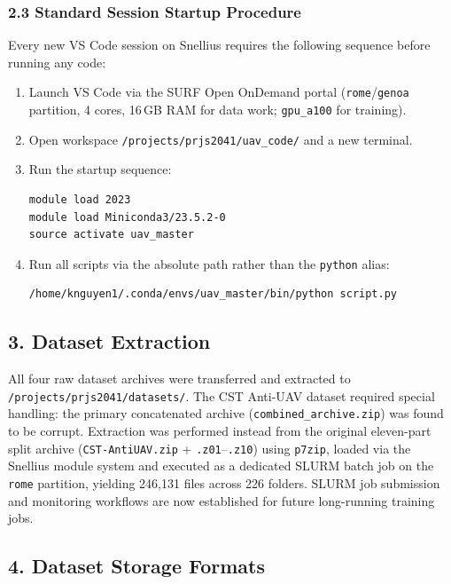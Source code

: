 \subsubsection*{2.3 Standard Session Startup Procedure}

Every new VS Code session on Snellius requires the following sequence
before running any code:

\begin{enumerate}
    \item Launch VS Code via the SURF Open OnDemand portal
          (\texttt{rome}/\texttt{genoa} partition, 4 cores, 16\,GB RAM
          for data work; \texttt{gpu\_a100} for training).
    \item Open workspace \texttt{/projects/prjs2041/uav\_code/} and a
          new terminal.
    \item Run the startup sequence:
\begin{verbatim}
module load 2023
module load Miniconda3/23.5.2-0
source activate uav_master
\end{verbatim}
    \item Run all scripts via the absolute path rather than the
          \texttt{python} alias:
\begin{verbatim}
/home/knguyen1/.conda/envs/uav_master/bin/python script.py
\end{verbatim}
\end{enumerate}

\subsection*{3. Dataset Extraction}

All four raw dataset archives were transferred and extracted to
\texttt{/projects/prjs2041/datasets/}. The CST Anti-UAV dataset required
special handling: the primary concatenated archive
(\texttt{combined\_archive.zip}) was found to be corrupt. Extraction was
performed instead from the original eleven-part split archive
(\texttt{CST-AntiUAV.zip} + \texttt{.z01}--\texttt{.z10}) using
\texttt{p7zip}, loaded via the Snellius module system and executed as a
dedicated SLURM batch job on the \texttt{rome} partition, yielding
246,131 files across 226 folders. SLURM job submission and monitoring
workflows are now established for future long-running training jobs.

\subsection*{4. Dataset Storage Formats}

